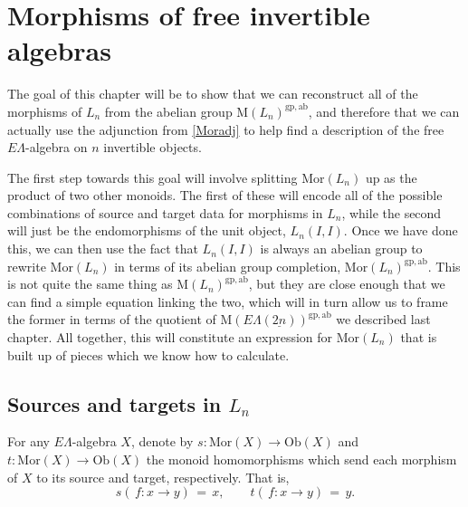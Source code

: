 \documentclass{amsbook} %
\newcommand{\ELnn}{E\Lambda(\underline{2n})}
\numberwithin{section}{chapter}
\begin{document}
\chapter{Morphisms of free invertible algebras}
\label{morphisms}
 
The goal of this chapter will be to show that we can reconstruct all of the morphisms of $L_n$ from the abelian group $\mathrm{M}(L_n)^{\mathrm{gp, ab}}$, and therefore that we can actually use the adjunction from \cref{Moradj} to help find a description of the free $E\Lambda$-algebra on $n$ invertible objects. 

The first step towards this goal will involve splitting $\mathrm{Mor}(L_n)$ up as the product of two other monoids. The first of these will encode all of the possible combinations of source and target data for morphisms in $L_n$, while the second will just be the endomorphisms of the unit object, $L_n(I, I)$. %
Once we have done this, we can then use the fact that $L_n(I, I)$ is always an abelian group to rewrite $\mathrm{Mor}(L_n)$ in terms of its abelian group completion, $\mathrm{Mor}(L_n)^{\mathrm{gp, ab}}$. This is not quite the same thing as $\mathrm{M}(L_n)^{\mathrm{gp, ab}}$, but they are close enough that we can find a simple equation linking the two, which will in turn allow us to frame the former in terms of the quotient of $\mathrm{M}(\ELnn)^{\mathrm{gp, ab}}$ we described last chapter. All together, this will constitute an expression for $\mathrm{Mor}(L_n)$ that is built up of pieces which we know how to calculate.

\section{Sources and targets in \texorpdfstring{$L_n$}{L_n}}   


\begin{Defi}\label{st} For any $E\Lambda$-algebra $X$, denote by $s: \mathrm{Mor}(X) \to \mathrm{Ob}(X)$ and $t: \mathrm{Mor}(X) \to \mathrm{Ob}(X)$ the monoid homomorphisms which send each morphism of $X$ to its source and target, respectively. That is,
\[ s( \, f: x \to y) \, = \, x, \quad \quad t( \, f: x \to y) \, = \, y. \]
\end{Defi}
\end{document}
